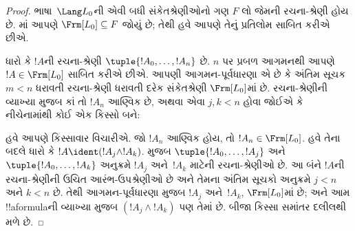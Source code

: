 \documentclass[../../../include/open-logic-section]{subfiles}
\begin{document}
\begin{proof}
ભાષા~$\Lang L_0$ની એવી બધી સંકેતશ્રેણીઓનો ગણ $F$ લો જેમની
રચના-શ્રેણી હોય છે. માં આપણે
$\Frm[L_0]\subseteq F$ જોયું છે; તેથી હવે આપણે તેનું પ્રતિલોમ
સાબિત કરીએ છીએ.

ધારો કે $!A$ની રચના-શ્રેણી $\tuple{!A_0,\dotsc,!A_n}$ છે. $n$ પર
પ્રબળ આગમનથી આપણે $!A\in\Frm[L_0]$ સાબિત કરીએ છીએ. આપણી
આગમન-પૂર્વધારણા એ છે કે અંતિમ સૂચક $m<n$ ધરાવતી રચના-શ્રેણી ધરાવતી દરેક
સંકેતશ્રેણી $\Frm[L_0]$માં છે. રચના-શ્રેણીની વ્યાખ્યા મુજબ કાં તો
$!A_n$ આણ્વિક છે, અથવા એવા $j,k<n$ હોવા જોઈએ કે નીચેનામાંથી કોઈ એક
કિસ્સો બને:
\begin{enumerate}
\end{enumerate}
હવે આપણે કિસ્સાવાર વિચારીએ. જો $!A_n$ આણ્વિક હોય, તો
$!A_n\in\Frm[L_0]$. હવે તેના બદલે ધારો કે $!A\ident
(!A_j\land !A_k)$.  મુજબ
$\tuple{!A_0,\dotsc,!A_j}$ અને $\tuple{!A_0,\dotsc,!A_k}$ અનુક્રમે
$!A_j$ અને~$!A_k$ માટેની રચના-શ્રેણીઓ છે. આ બંને $!A$ની
રચના-શ્રેણીની ઉચિત આરંભ-ઉપશ્રેણીઓ છે અને તેમના અંતિમ સૂચકો અનુક્રમે $j<n$ અને $k<n$ છે.
તેથી આગમન-પૂર્વધારણા મુજબ $!A_j$ અને~$!A_k$, $\Frm[L_0]$માં છે;
અને આમ !!a{formula}ની વ્યાખ્યા મુજબ $(!A_j\land !A_k)$ પણ તેમાં છે.
બીજા કિસ્સા સમાંતર દલીલથી મળે છે.
\end{proof}
\end{document}
